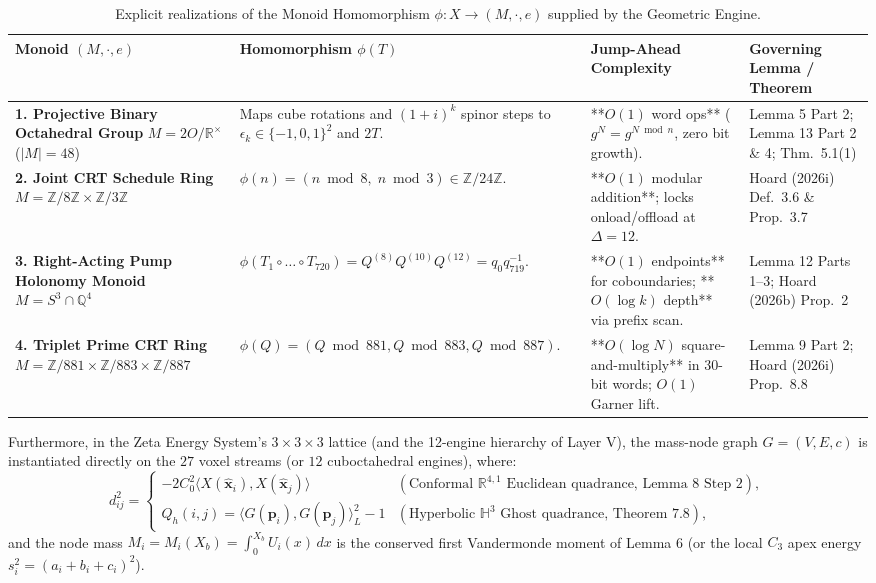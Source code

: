 \documentclass[11pt, a4paper]{article}
\begin{document}
\begin{table}[htbp]
\centering
\caption{Explicit realizations of the Monoid Homomorphism $\phi: X \to (M, \cdot, e)$ supplied by the Geometric Engine.}
\label{tab:monoid-realizations}
\begin{tabular}{@{}p{3.4cm}p{4.0cm}p{3.6cm}p{3.8cm}@{}}
\toprule
\textbf{Monoid $(M, \cdot, e)$} & \textbf{Homomorphism $\phi(T)$} & \textbf{Jump-Ahead Complexity} & \textbf{Governing Lemma / Theorem} \\
\midrule
\textbf{1. Projective Binary Octahedral Group} $M = 2O / \mathbb{R}^\times$ ($|M|=48$) & Maps cube rotations and $(1+i)^k$ spinor steps to $\epsilon_k \in \{-1,0,1\}^2$ and $2T$. & **$O(1)$ word ops** ($g^N = g^{N \bmod n}$, zero bit growth). & Lemma 5 Part 2; Lemma 13 Part 2 \& 4; Thm.~5.1(1) \\
\addlinespace
\textbf{2. Joint CRT Schedule Ring} $M = \mathbb{Z}/8\mathbb{Z} \times \mathbb{Z}/3\mathbb{Z}$ & $\phi(n) = (n \bmod 8,\; n \bmod 3) \in \mathbb{Z}/24\mathbb{Z}$. & **$O(1)$ modular addition**; locks onload/offload at $\Delta = 12$. & Hoard (2026i) Def.~3.6 \& Prop.~3.7 \\
\addlinespace
\textbf{3. Right-Acting Pump Holonomy Monoid} $M = S^3 \cap \mathbb{Q}^4$ & $\phi(T_1 \circ \dots \circ T_{720}) = Q^{(8)}Q^{(10)}Q^{(12)} = q_0 q_{719}^{-1}$. & **$O(1)$ endpoints** for coboundaries; **$O(\log k)$ depth** via prefix scan. & Lemma 12 Parts 1--3; Hoard (2026b) Prop.~2 \\
\addlinespace
\textbf{4. Triplet Prime CRT Ring} $M = \mathbb{Z}/881 \times \mathbb{Z}/883 \times \mathbb{Z}/887$ & $\phi(Q) = (Q \bmod 881, Q \bmod 883, Q \bmod 887)$. & **$O(\log N)$ square-and-multiply** in 30-bit words; $O(1)$ Garner lift. & Lemma 9 Part 2; Hoard (2026i) Prop.~8.8 \\
\bottomrule
\end{tabular}
\end{table}

Furthermore, in the Zeta Energy System's $3\times 3\times 3$ lattice (and the 12-engine hierarchy of Layer V), the mass-node graph $G = (V, E, c)$ is instantiated directly on the $27$ voxel streams (or $12$ cuboctahedral engines), where:
\begin{equation}
d_{ij}^2 = \begin{cases}
-2 C_0^2 \langle X(\hat{\mathbf{x}}_i), X(\hat{\mathbf{x}}_j)\rangle & (\text{Conformal } \mathbb{R}^{4,1} \text{ Euclidean quadrance, Lemma 8 Step 2}), \\[0.4em]
Q_h(i, j) = \langle G(\mathbf{p}_i), G(\mathbf{p}_j)\rangle_L^2 - 1 & (\text{Hyperbolic } \mathbb{H}^3 \text{ Ghost quadrance, Theorem 7.8}),
\end{cases}
\end{equation}
and the node mass $M_i = M_i(X_b) = \int_0^{X_b} U_i(x)\,dx$ is the conserved first Vandermonde moment of Lemma 6 (or the local $C_3$ apex energy $s_i^2 = (a_i + b_i + c_i)^2$).
\end{document}
